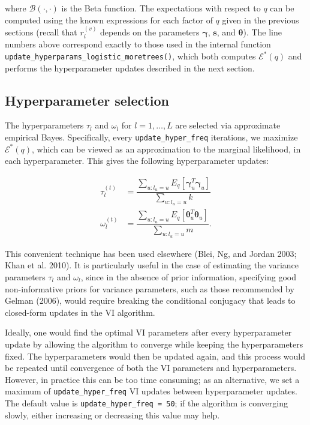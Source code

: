 \documentclass[]{article}
\begin{document}
where \(\mathcal{B}(\cdot,\cdot)\) is the Beta function. The
expectations with respect to \(q\) can be computed using the known
expressions for each factor of \(q\) given in the previous sections
(recall that \(r_i^{(v)}\) depends on the parameters
\(\boldsymbol{\gamma}\), \(\mathbf{s}\), and \(\boldsymbol{\theta}\)).
The line numbers above correspond exactly to those used in the internal
function \texttt{update\_hyperparams\_logistic\_moretrees()}, which both
computes \(\mathcal{E}^*(q)\) and performs the hyperparameter updates
described in the next section.

\hypertarget{hyperparameter-selection}{%
\subsection{Hyperparameter selection}\label{hyperparameter-selection}}

The hyperparameters \(\tau_l\) and \(\omega_l\) for \(l = 1, \dots, L\)
are selected via approximate empirical Bayes. Specifically, every
\texttt{update\_hyper\_freq} iterations, we maximize
\(\mathcal{E}^*(q)\), which can be viewed as an approximation to the
marginal likelihood, in each hyperparameter. This gives the following
hyperparameter updates:

\begin{align*}
\tau_l^{(t)} & = \dfrac{\sum_{u: l_u = u} E_{q}\left[ \boldsymbol{\gamma}_u^T \boldsymbol{\gamma}_u \right]}{\sum_{u: l_u = u} k} \\
\omega_l^{(t)} & = \dfrac{\sum_{u: l_u = u} E_{q} \left[ \boldsymbol{\theta}_u^T \boldsymbol{\theta}_u \right]}{\sum_{u: l_u = u} m}.
\end{align*}

This convenient technique has been used elsewhere (Blei, Ng, and Jordan
2003; Khan et al. 2010). It is particularly useful in the case of
estimating the variance parameters \(\tau_l\) and \(\omega_l\), since in
the absence of prior information, specifying good non-informative priors
for variance parameters, such as those recommended by Gelman (2006),
would require breaking the conditional conjugacy that leads to
closed-form updates in the VI algorithm.

Ideally, one would find the optimal VI parameters after every
hyperparameter update by allowing the algorithm to converge while
keeping the hyperparameters fixed. The hyperparameters would then be
updated again, and this process would be repeated until convergence of
both the VI parameters and hyperparameters. However, in practice this
can be too time consuming; as an alternative, we set a maximum of
\texttt{update\_hyper\_freq} VI updates between hyperparameter updates.
The default value is \texttt{update\_hyper\_freq\ =\ 50}; if the
algorithm is converging slowly, either increasing or decreasing this
value may help.
\end{document}

